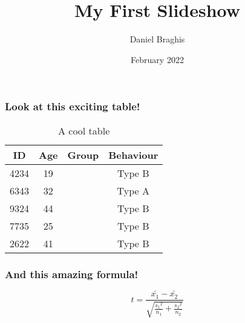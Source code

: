 \documentclass{beamer}
\title{\HUGE My First Slideshow}
\author{Daniel Braghis}
\date{February 2022}
\begin{document}
\frame{\titlepage}

\begin{frame}

\frametitle{Look at this exciting table!}

\begin{table}
	\begin{center}
		\begin{tabular}{ | c | c | c | c |}
			\hline
			ID & Age & Group & Behaviour\\
			\hline
			4234 & 19 & \alpha & Type B\\
			\hline
			6343 & 32 & \beta & Type A\\
			\hline
			9324 & 44 & \beta & Type B\\
			\hline
			7735 & 25 & \alpha & Type B\\
			\hline
			2622 & 41 & \beta & Type B\\
			\hline
		\end{tabular}
	\end{center}
	\caption{A cool table}
	\label{table2}
\end{table}

\end{frame}

\begin {frame}

\frametitle{And this amazing formula!}

\Huge

$$t=\frac{\bar{x_1} - \bar{x_2}}{\sqrt{\frac{{s_1}^2}{n_1} + \frac{{s_2}^2}{n_2}}}$$

\end {frame}
\end{document}
